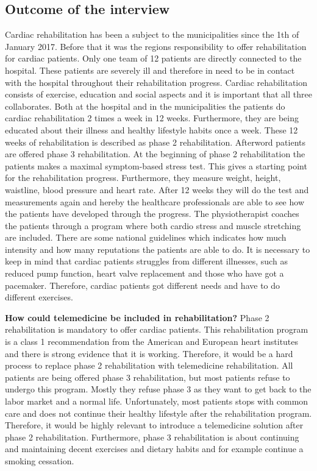 \subsection{Outcome of the interview} 
Cardiac rehabilitation has been a subject to the municipalities since the 1th of January 2017. Before that it was the regions responsibility to offer rehabilitation for cardiac patients. Only one team of 12 patients are directly connected to the hospital. These patients are severely ill and therefore in need to be in contact with the hospital throughout their rehabilitation progress. Cardiac rehabilitation consists of exercise, education and social aspects and it is important that all three collaborates. Both at the hospital and in the municipalities the patients do cardiac rehabilitation 2 times a week in 12 weeks. Furthermore, they are being educated about their illness and healthy lifestyle habits once a week. These 12 weeks of rehabilitation is described as phase 2 rehabilitation. Afterword patients are offered phase 3 rehabilitation. At the beginning of phase 2 rehabilitation the patients makes a maximal symptom-based stress test. This gives a starting point for the rehabilitation progress. Furthermore, they measure weight, height, waistline, blood pressure and heart rate. After 12 weeks they will do the test and measurements again and hereby the healthcare professionals are able to see how the patients have developed through the progress. The physiotherapist coaches the patients through a program where both cardio stress and muscle stretching are included. There are some national guidelines which indicates how much intensity and how many reputations the patients are able to do. It is necessary to keep in mind that cardiac patients struggles from different illnesses, such as reduced pump function, heart valve replacement and those who have got a pacemaker. Therefore, cardiac patients got different needs and have to do different exercises.  

\textbf{How could telemedicine be included in rehabilitation?} \newline 
Phase 2 rehabilitation is mandatory to offer cardiac patients. This rehabilitation program is a class 1 recommendation from the American and European heart institutes and there is strong evidence that it is working. Therefore, it would be a hard process to replace phase 2 rehabilitation with telemedicine rehabilitation. All patients are being offered phase 3 rehabilitation, but most patients refuse to undergo this program. Mostly they refuse phase 3 as they want to get back to the labor market and a normal life. Unfortunately, most patients stops with common care and does not continue their healthy lifestyle after the rehabilitation program. Therefore, it would be highly relevant to introduce a telemedicine solution after phase 2 rehabilitation. Furthermore, phase 3 rehabilitation is about continuing and maintaining decent exercises and dietary habits and for example continue a smoking cessation. 

